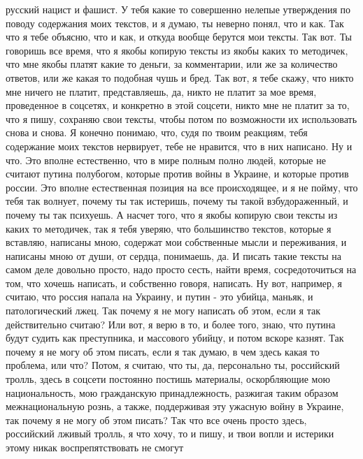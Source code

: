  
 
 
 
 

русский нацист и фашист. У тебя какие то совершенно нелепые утверждения по
поводу содержания моих текстов, и я думаю, ты неверно понял, что и как.  Так
что я тебе объясню, что и как, и откуда вообще берутся мои тексты. Так вот. Ты
говоришь все время, что я якобы копирую тексты из якобы каких то методичек, что
мне якобы платят какие то деньги, за комментарии, или же за количество ответов,
или же какая то подобная чушь и бред. Так вот, я тебе скажу, что никто мне
ничего не платит, представляешь, да, никто не платит за мое время, проведенное
в соцсетях, и конкретно в этой соцсети, никто мне не платит за то, что я пишу,
сохраняю свои тексты, чтобы потом по возможности их использовать снова и снова.
Я конечно понимаю, что, судя по твоим реакциям, тебя содержание моих текстов
нервирует, тебе не нравится, что в них написано.  Ну и что. Это вполне
естественно, что в мире полным полно людей, которые не считают путина
полубогом, которые против войны в Украине, и которые против россии. Это вполне
естественная позиция на все происходящее, и я не пойму, что тебя так волнует,
почему ты так истеришь, почему ты такой взбудораженный, и почему ты так
психуешь. А насчет того, что я якобы копирую свои тексты из каких то методичек,
так я тебя уверяю, что большинство текстов, которые я вставляю, написаны мною,
содержат мои собственные мысли и переживания, и написаны мною от души, от
сердца, понимаешь, да. И писать такие тексты на самом деле довольно просто,
надо просто сесть, найти время, сосредоточиться на том, что хочешь написать, и
собственно говоря, написать. Ну вот, например, я считаю, что россия напала на
Украину, и путин - это убийца, маньяк, и патологический лжец. Так почему я не
могу написать об этом, если я так действительно считаю? Или вот, я верю в то, и
более того, знаю, что путина будут судить как преступника, и массового убийцу,
и потом вскоре казнят.  Так почему я не могу об этом писать, если я так думаю,
в чем здесь какая то проблема, или что? Потом, я считаю, что ты, да,
персонально ты, российский тролль, здесь в соцсети постоянно постишь материалы,
оскорбляющие мою национальность, мою гражданскую принадлежность, разжигая таким
образом межнациональную рознь, а также, поддерживая эту ужасную войну в
Украине, так почему я не могу об этом писать?  Так что все очень просто здесь,
российский лживый тролль, я что хочу, то и пишу, и твои вопли и истерики этому
никак воспрепятствовать не смогут
